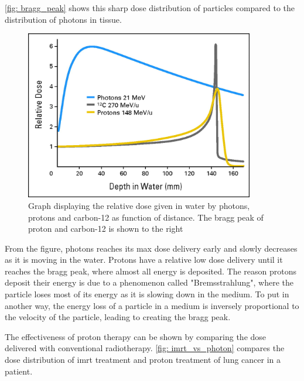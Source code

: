 \documentclass[main.tex]{subfiles}
\begin{document}
\autoref{fig: bragg_peak} shows this sharp dose distribution of particles compared to the distribution of photons in tissue.

 \begin{figure}[!htpb]
    \centering
    \includegraphics[width=10cm ]{images/bragg_peak.jpeg}
    \caption{Graph displaying the relative dose given in water by photons, protons and carbon-12 as function of distance. The bragg peak of proton and carbon-12 is shown to the right\cite{bragg_peak_image}}
    \label{fig: bragg_peak}
\end{figure}
\FloatBarrier 

From the figure, photons reaches its max dose delivery early and slowly decreases as it is moving in the water. Protons have a relative low dose delivery until it reaches the bragg peak, where almost all energy is deposited. The reason protons deposit their energy is due to a phenomenon called "Bremsstrahlung", where the particle loses most of its energy as it is slowing down in the medium. To put in another way, the energy loss of a particle in a medium is inversely proportional to the velocity of the particle, leading to creating the bragg peak.

The effectiveness of proton therapy can be shown by comparing the dose delivered with conventional radiotherapy. \autoref{fig: imrt_vs_photon} compares the dose distribution of \gls{imrt} treatment and proton treatment of lung cancer in a patient.
\end{document}
